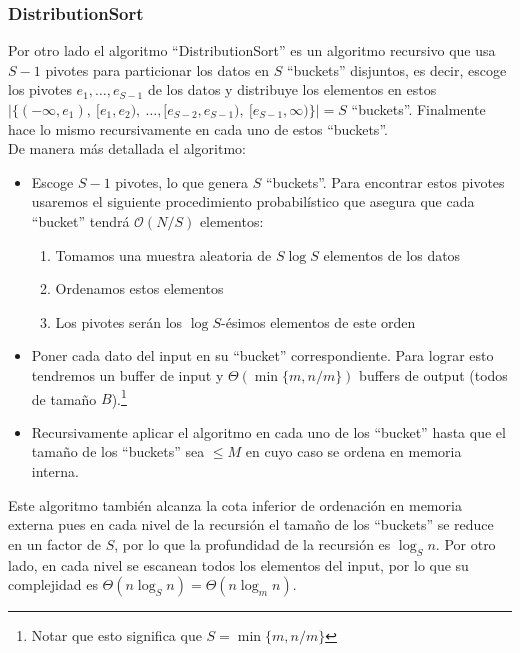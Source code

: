 \documentclass[dcc,uchile]{fcfmcourse}
\begin{document}
\subsubsection{DistributionSort}
Por otro lado el algoritmo ``DistributionSort'' es un algoritmo recursivo que usa $S-1$ pivotes para particionar los datos en $S$ ``buckets'' disjuntos, es decir, escoge los pivotes $e_{1}, \ldots, e_{S-1}$ de los datos y distribuye los elementos en estos $|\{(-\infty , e_{1}),\ [e_{1}, e_{2}),\ \ldots , [e_{S-2}, e_{S-1}),\ [e_{S-1}, \infty)\}|= S$ ``buckets''. Finalmente hace lo mismo recursivamente en cada uno de estos ``buckets''. \\
De manera más detallada el algoritmo:
\begin{itemize}
    \item Escoge $S-1$ pivotes, lo que genera $S$ ``buckets''. Para encontrar estos pivotes usaremos el siguiente procedimiento probabilístico que asegura que cada ``bucket'' tendrá $\mathcal{O}(N/S)$ elementos:
        \begin{enumerate}
            \item Tomamos una muestra aleatoria de $S \log S$ elementos de los datos
            \item Ordenamos estos elementos
            \item Los pivotes serán los $\log S$-ésimos elementos de este orden
        \end{enumerate}
    \item Poner cada dato del input en su ``bucket'' correspondiente. Para lograr esto tendremos un buffer de input y $\Theta(\min\{m,n/m\})$ buffers de output (todos de tamaño $B$).\footnote{Notar que esto significa que $S=\min\{m,n/m\}$}
    
    \item Recursivamente aplicar el algoritmo en cada uno de los ``bucket'' hasta que el tamaño de los ``buckets'' sea $\le M$ en cuyo caso se ordena en memoria interna.
\end{itemize}
Este algoritmo también alcanza la cota inferior de ordenación en memoria externa pues en cada nivel de la recursión el tamaño de los ``buckets'' se reduce en un factor de $S$, por lo que la profundidad de la recursión es $\log_{S} n$. Por otro lado, en cada nivel se escanean todos los elementos del input, por lo que su complejidad es  $\Theta(n\log_{S}n) = \Theta(n\log_{m}n)$.
\end{document}
